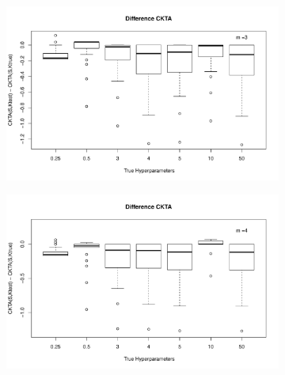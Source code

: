 \documentclass[11pt, a4paper]{article} %
\begin{document}
\begin{landscape}
\begin{figure}
\begin{subfigure}{\textwidth}
  \centering
  \includegraphics[width=.8\linewidth]{dif_ckta_m_3.pdf}
  \label{fig:sfig1}
\end{subfigure}%
\begin{subfigure}{\textwidth}
  \centering
  \includegraphics[width=.8\linewidth]{dif_ckta_m_4.pdf}
  \label{fig:sfig1}
\end{subfigure}


\label{fig1}
\end{figure}

\end{landscape}

\restoregeometry
\end{document}
